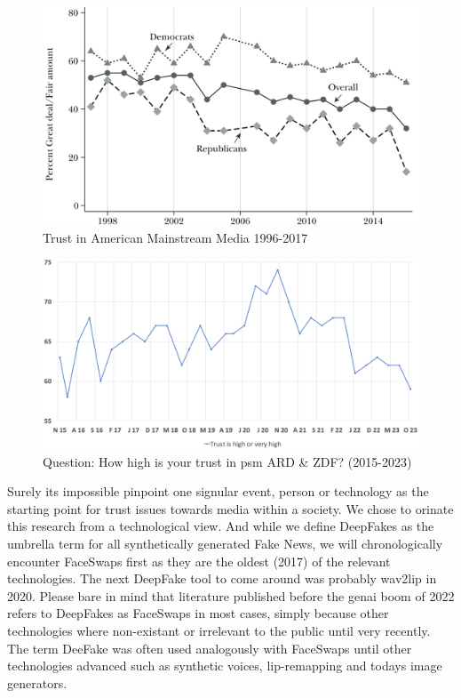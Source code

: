 \documentclass[
  a4paper,  %
  twoside,  %
  bibliography=totoc,
  headsepline,
  cleardoublepage=empty,
  parskip=half,
  draft=false
]{scrbook}
\begin{document}
\begin{figure}[h]
  \centering
  \centering
  \includegraphics[width=0.75\linewidth]{./graphics/images/trust-america mainstream.png}
  \caption{Trust in American Mainstream Media 1996-2017 \cite{allcottSocialMediaFake2017}}
  \label{fig:trust-us}
\end{figure}
\begin{figure}[h]
  \centering
  \includegraphics[width=0.8\linewidth]{./graphics/images/FGW-Trust-in-ARDZDF.png}
  \caption{Question: How high is your trust in \gls{psm} ARD \& ZDF? (2015-2023) \cite{zdf-politbarometerVertrauenGlaubwuerdigkeitBerichterstattung2023}}
  \label{fig:trust-ger}
\end{figure}

Surely its impossible pinpoint one signular event, person or technology as the starting point for trust issues towards media within a society. We chose to orinate this research from a technological view. And while we define DeepFakes as the umbrella term for all synthetically generated Fake News, we will chronologically encounter FaceSwaps first as they are the oldest (2017) of the relevant technologies. The next DeepFake tool to come around was probably wav2lip in 2020. Please bare in mind that literature published before the \gls{genai} boom of 2022 refers to DeepFakes as FaceSwaps in most cases, simply because other technologies where non-existant or irrelevant to the public until very recently. The term DeeFake was often used analogously with FaceSwaps until other technologies advanced such as synthetic voices, lip-remapping and todays image generators.
\end{document}
